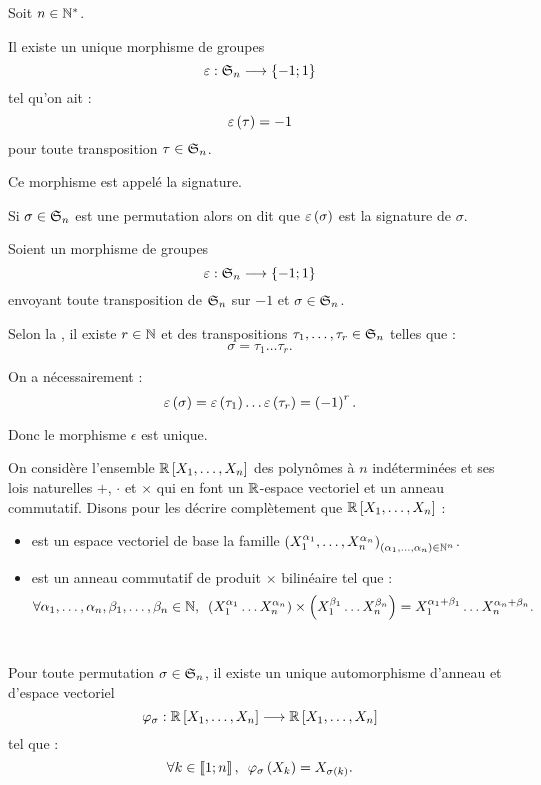 \begin{deftheo}[Signature]
Soit \(n\in\Ns\).

Il existe un unique morphisme de groupes \[\epsilon:\S{n}\to\accol{-1;1}\] tel qu'on ait : \[\sig{\tau}=-1\] pour toute transposition \(\tau\in\S{n}\).

Ce morphisme est appelé la signature.

Si \(\sigma\in\S{n}\) est une permutation alors on dit que \(\sig{\sigma}\) est la signature de \(\sigma\).
\end{deftheo}

\begin{dem}

\unicite

Soient un morphisme de groupes \[\epsilon:\S{n}\to\accol{-1;1}\] envoyant toute transposition de \(\S{n}\) sur \(-1\) et \(\sigma\in\S{n}\).

Selon la , il existe \(r\in\N\) et  des transpositions \(\tau_1,\dots,\tau_r\in\S{n}\) telles que : \[\sigma=\tau_1\dots\tau_r.\]

On a nécessairement : \[\sig{\sigma}=\sig{\tau_1}\dots\sig{\tau_r}=\paren{-1}^r.\]

Donc le morphisme \(\epsilon\) est unique.

\existence\newcommand{\polys}{\poly[\R][X_1,\dots,X_n]}

On considère l'ensemble \(\polys\) des polynômes à \(n\) indéterminées et ses lois naturelles \(+\), \(\cdot\) et \(\times\) qui en font un \(\R\)-espace vectoriel et un anneau commutatif. Disons pour les décrire complètement que \(\polys\) : \begin{itemize}
    \item est un espace vectoriel de base la famille \(\paren{X_1^{\alpha_1},\dots,X_n^{\alpha_n}}_{\paren{\alpha_1,\dots,\alpha_n}\in\N^n}\).
    \item est un anneau commutatif de produit \(\times\) bilinéaire tel que : \[\quantifs{\forall\alpha_1,\dots,\alpha_n,\beta_1,\dots,\beta_n\in\N}\paren{X_1^{\alpha_1}\dots X_n^{\alpha_n}}\times\paren{X_1^{\beta_1}\dots X_n^{\beta_n}}=X_1^{\alpha_1+\beta_1}\dots X_n^{\alpha_n+\beta_n}.\]~
\end{itemize}

Pour toute permutation \(\sigma\in\S{n}\), il existe un unique automorphisme d'anneau et d'espace vectoriel \[\phi_\sigma:\polys\to\polys\] tel que : \[\quantifs{\forall k\in\interventierii{1}{n}}\phi_\sigma\paren{X_k}=X_{\sigma\paren{k}}.\]


\end{dem}
